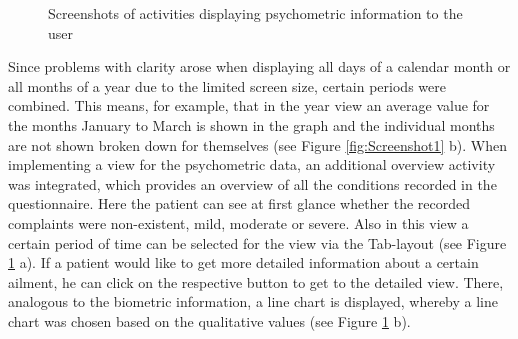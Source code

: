 \begin{figure}[h!]
    \centering
    \caption[Screenshots of activities displaying psychometric information to the user]{Screenshots of activities displaying psychometric information to the user \endtabular}
    \label{fig:Screenshot2}
\end{figure}

Since problems with clarity arose when displaying all days of a calendar month or all months of a year due to the limited screen size, certain periods were combined. This means, for example, that in the year view an average value for the months January to March is shown in the graph and the individual months are not shown broken down for themselves (see Figure \ref{fig:Screenshot1} b). When implementing a view for the psychometric data, an additional overview activity was integrated, which provides an overview of all the conditions recorded in the questionnaire. Here the patient can see at first glance whether the recorded complaints were non-existent, mild, moderate or severe. Also in this view a certain period of time can be selected for the view via the Tab-layout (see Figure \ref{fig:Screenshot2} a). If a patient would like to get more detailed information about a certain ailment, he can click on the respective button to get to the detailed view. There, analogous to the biometric information, a line chart is displayed, whereby a line chart was chosen based on the qualitative values (see Figure \ref{fig:Screenshot2} b). 

